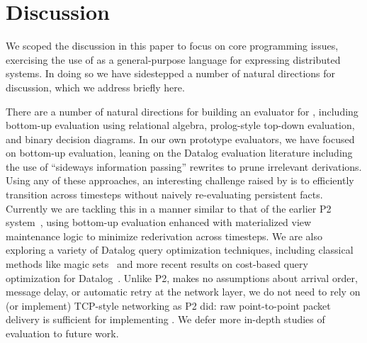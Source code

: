 \section{Discussion}
We scoped the discussion in this paper to focus on core programming issues, exercising the use of \lang as a general-purpose language for expressing distributed systems.  In doing so we have sidestepped a number of natural directions for discussion, which we address briefly here.
    
There are a number of natural directions for building an evaluator for \lang, including bottom-up evaluation using relational algebra, prolog-style top-down evaluation, and binary decision diagrams.  In our own prototype evaluators, we have focused on bottom-up evaluation, leaning on the Datalog evaluation literature including the use of ``sideways information passing'' rewrites to prune irrelevant derivations.  Using any of these approaches, an interesting challenge raised by \lang is to efficiently transition across timesteps without naively re-evaluating persistent facts.  Currently we are tackling this in a manner similar to that of the earlier P2 system~\cite{cacm}, using bottom-up evaluation enhanced with materialized view maintenance logic to minimize rederivation across timesteps. We are also exploring a variety of Datalog query optimization techniques, including classical methods like magic sets~\cite{ullmanbook} and more recent results on cost-based query optimization for Datalog~\cite{demoor}.  Unlike P2, \lang makes no assumptions about arrival order, message delay, or automatic retry at the network layer, we do not need to rely on (or implement) TCP-style networking as P2 did: raw point-to-point packet delivery is sufficient for implementing \lang.  We defer more in-depth studies of \lang evaluation to future work.


